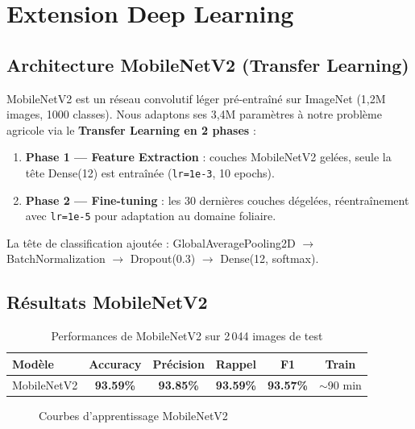 \documentclass[12pt,a4paper]{article}
\begin{document}
\section{Extension Deep Learning}

\subsection{Architecture MobileNetV2 (Transfer Learning)}

MobileNetV2 est un réseau convolutif léger pré-entraîné sur ImageNet (1,2M images, 
1000 classes). Nous adaptons ses 3,4M paramètres à notre problème agricole via 
le \textbf{Transfer Learning en 2 phases} :

\begin{enumerate}
  \item \textbf{Phase 1 — Feature Extraction} : couches MobileNetV2 gelées, 
  seule la tête Dense(12) est entraînée (\texttt{lr=1e-3}, 10 epochs).
  \item \textbf{Phase 2 — Fine-tuning} : les 30 dernières couches dégelées, 
  réentraînement avec \texttt{lr=1e-5} pour adaptation au domaine foliaire.
\end{enumerate}

La tête de classification ajoutée : GlobalAveragePooling2D $\rightarrow$ 
BatchNormalization $\rightarrow$ Dropout(0.3) $\rightarrow$ Dense(12, softmax).

\subsection{Résultats MobileNetV2}

\begin{table}[H]
\centering\small
\begin{tabular}{lccccc}
\toprule
\textbf{Modèle} & \textbf{Accuracy} & \textbf{Précision} & \textbf{Rappel} & \textbf{F1} & \textbf{Train} \\
\midrule
MobileNetV2 & \textbf{93.59\%} & \textbf{93.85\%} & \textbf{93.59\%} & \textbf{93.57\%} & $\sim$90 min \\
\bottomrule
\end{tabular}
\caption{Performances de MobileNetV2 sur 2\,044 images de test}
\end{table}

\begin{figure}[H]
\centering
{}
\caption{Courbes d'apprentissage MobileNetV2}
\end{figure}
\end{document}
